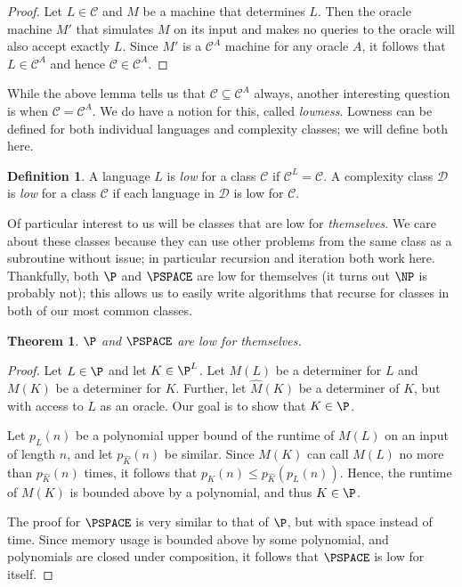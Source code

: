 \documentclass[english,12pt]{reedthesis}
\theoremstyle{plain}
\newtheorem{thm}{Theorem}[section]
\theoremstyle{definition}
\newtheorem{defn}[defn]{Definition}
\theoremstyle{remark}
\begin{document}
\begin{proof}
  Let $L \in \mathcal{C}$ and $M$ be a machine that determines $L$. Then the oracle machine
  $M'$ that simulates $M$ on its input and makes no queries to the oracle will
  also accept exactly $L$. Since $M'$ is a $\mathcal{C}^{A}$ machine for any oracle $A$,
  it follows that $L \in \mathcal{C}^{A}$ and hence $\mathcal{C} \in \mathcal{C}^{A}$.
\end{proof}

While the above lemma tells us that $\mathcal{C} \subseteq \mathcal{C}^{A}$ always, another interesting
question is when $\mathcal{C} = \mathcal{C}^{A}$. We do have a notion for this, called
\emph{lowness}. Lowness can be defined for both individual languages and
complexity classes; we will define both here.

\begin{defn}\label{def:low}
  A language $L$ is \emph{low} for a class $\mathcal{C}$ if $\mathcal{C}^{L} = \mathcal{C}$. A complexity
  class $\mathcal{D}$ is \emph{low} for a class $\mathcal{C}$ if each language in $\mathcal{D}$ is low for
  $\mathcal{C}$.
\end{defn}

Of particular interest to us will be classes that are low for \emph{themselves}.
We care about these classes because they can use other problems from the same
class as a subroutine without issue; in particular recursion and iteration both
work here. Thankfully, both $\P$ and $\PSPACE$ are low for themselves (it turns
out $\NP$ is probably not); this allows us to easily write algorithms that
recurse for classes in both of our most common classes.

\begin{thm}\label{thm:p-pspace-low}
  $\P$ and $\PSPACE$ are low for themselves.
\end{thm}

\begin{proof}
  Let $L \in \P$ and let $K \in \P^{L}$. Let $M(L)$ be a determiner for $L$ and
  $M(K)$ be a determiner for $K$. Further, let $\hat{M}(K)$ be a determiner of
  $K$, but with access to $L$ as an oracle. Our goal is to show that $K \in \P$.

  Let $p_{L}(n)$ be a polynomial upper bound of the runtime of $M(L)$ on an
  input of length $n$, and let $p_{\hat{K}}(n)$ be similar. Since $M(K)$ can
  call $M(L)$ no more than $p_{\hat{K}}(n)$ times, it follows that
  $p_{K}(n) \le p_{\hat{K}}(p_{L}(n))$. Hence, the runtime of $M(K)$ is bounded
  above by a polynomial, and thus $K \in \P$.

  The proof for $\PSPACE$ is very similar to that of $\P$, but with space
  instead of time. Since memory usage is bounded above by some polynomial, and
  polynomials are closed under composition, it follows that $\PSPACE$ is low for
  itself.
\end{proof}
\end{document}
